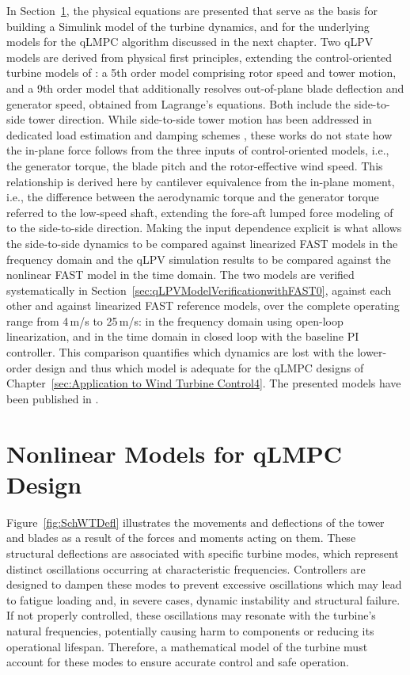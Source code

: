 In Section~\ref{sec:MechanicalAerodynamicSubsystemModel}, the physical equations are presented
that serve as the basis for building a Simulink model of the turbine dynamics, and for the
underlying models for the qLMPC algorithm discussed in the next chapter. Two qLPV models are
derived from physical first principles, extending the control-oriented turbine models of
\cite{schlipf2013nonlinear, Bianchi2007}: a 5th order model comprising
rotor speed and tower motion, and a 9th order model that additionally resolves out-of-plane blade
deflection and generator speed, obtained from Lagrange's equations.
Both include the side-to-side tower direction. While side-to-side tower motion has been addressed
in dedicated load estimation and damping schemes \cite{mulders2020preventing,
    pamososuryo2022loadestimation, pamososuryo2022individual, fonseca2024windTurbineSideSide}, these
works do not state how the in-plane force follows from the three inputs of control-oriented models, i.e., the generator torque, the blade pitch and the rotor-effective wind speed. This relationship is derived here by cantilever equivalence
from the in-plane moment, i.e., the difference between the aerodynamic torque and the generator
torque referred to the low-speed shaft, extending the fore-aft lumped force modeling of \cite{schlipf2013nonlinear, Bianchi2007}
to the side-to-side direction. Making the input dependence explicit is what allows the side-to-side dynamics to be compared
against linearized FAST models in the frequency domain and the qLPV simulation results to be
compared against the nonlinear FAST model in the time domain.
%
The two models are verified systematically in
Section~\ref{sec:qLPVModelVerificationwithFAST0}, against each other and against linearized
FAST reference models, over the complete operating range from 4\,m/s to 25\,m/s: in the frequency
domain using open-loop linearization, and in the time domain in closed loop with the
baseline PI controller. This comparison quantifies which dynamics are lost with the lower-order
design and thus which model is adequate for the qLMPC designs of
Chapter~\ref{sec:Application to Wind Turbine Control4}. The presented models have been published in \cite{dittmer2021velocity}.


\section{Nonlinear Models for qLMPC Design} \label{sec:MechanicalAerodynamicSubsystemModel}
Figure~\ref{fig:SchWTDefl} illustrates the movements and deflections of the tower and blades as a result of the forces and moments acting on them.
These structural deflections are associated with specific turbine modes, which represent distinct oscillations occurring at characteristic frequencies. Controllers are designed to dampen these modes to prevent excessive oscillations which may lead to fatigue loading and, in severe cases, dynamic instability and structural failure. If not properly controlled, these oscillations may resonate with the turbine’s natural frequencies, potentially causing harm to components or reducing its operational lifespan. Therefore, a mathematical model of the turbine must account for these modes to ensure accurate control and safe operation. 

